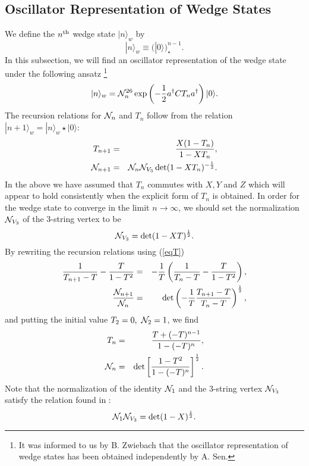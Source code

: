 \documentclass[a4paper,12pt]{article}
\def\N{{\cal N}}
\def\hf{{1\over 2}}
\def\o{\over}
\def\ket{\rangle}
\def\lf{\left}
\def\ri{\right}
\def\riya{\rightarrow}
\def\dag{\dagger}
\def\st{\star}
\def\a{a^{\dag}}
\begin{document}
\subsection{Oscillator Representation of Wedge States}
We define the $n^{\rm th}$ wedge state 
$|n\ket_w $ by \cite{RZ}
\begin{equation}
 |n\ket_w \equiv \Big(|0\ket\Big)_{\st}^{n-1}.
\end{equation}
In this subsection, we will find an oscillator representation of the 
wedge state under the following ansatz
 \footnote{It was informed to us by B. Zwiebach that the 
oscillator representation of wedge states has been obtained 
independently by A. Sen.}
\begin{equation}
|n\ket_w={\cal N}_n^{26}\exp\lf(-\hf \a CT_n\a\ri)|0\ket.
\end{equation}
The recursion relations for ${\cal N}_n$ and $T_n$ 
follow from the relation $|n+1\ket_w=|n\ket_w\st |0\ket$:
\begin{eqnarray}
T_{n+1}&=&{X(1-T_n)\o 1-XT_n}, \\
{\cal N}_{n+1}&=&{\cal N}_n\N_{V_3}\det(1-XT_n)^{-\hf}. 
\end{eqnarray}
In the above we have assumed that $T_n$ commutes with
$X,Y$ and $Z$ which will appear to hold consistently 
when the explicit form of $T_n$ is obtained.
In order for the wedge state to converge in the
limit $n\riya\infty$, we should set the normalization ${\cal N}_{V_3}$
of the 3-string vertex to be
\begin{equation}
 \N_{V_3}=\det(1-XT)^{\hf}.
\end{equation}
By rewriting the recursion relations using (\ref{eqT})
\begin{eqnarray}
{1\o T_{n+1}-T}-{T\o 1-T^2}&=&-{1\o T}\lf({1\o T_{n}-T}-{T\o 1-T^2}\ri), \\
{{\cal N}_{n+1}\o {\cal N}_n}&=&\det\lf(-{1\o T}
{T_{n+1}-T\o T_n-T}\ri)^{\hf}, 
\end{eqnarray}
and putting the initial value $T_2=0,~{\cal N}_2=1$, 
we find 
\begin{eqnarray}
T_n&=&{T+(-T)^{n-1}\o 1-(-T)^{n}}, \label{TN}\\
{\cal N}_n&=&\det\lf[{1-T^2\o 1-(-T)^{n}}\ri]^{\hf}. 
\end{eqnarray}
Note that the normalization of the identity $\N_1$ and the 3-string vertex
$\N_{V_3}$ satisfy the relation found in \cite{GrossTaylor}:
\begin{equation}
 \N_1\N_{V_3}=\det(1-X)^{\hf}.
\end{equation}
\end{document}
